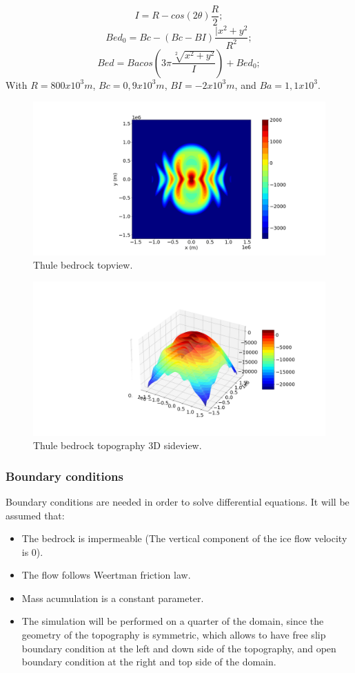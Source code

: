 \documentclass[a4paper,12pt]{article}
\begin{document}
\begin{equation}
	I=R-cos(2\theta)\frac{R}{2};
\end{equation}
\begin{equation}
	Bed_0=Bc-(Bc-BI)\frac{|x^2+y^2}{R^2};
\end{equation}
\begin{equation}
	Bed=Bacos(3\pi\frac{\sqrt[2]{x^2+y^2}}{I})+Bed_0;
\end{equation}
With $R=800 x 10^3 m$, $Bc=0,9 x 10^3 m$, $BI=-2 x 10^3 m$, and $Ba=1,1 x 10^3$.
\begin{figure}[!h]
	\centering
	\includegraphics[width=0.7\linewidth]{../fig/Thule_2D}
	\caption{Thule bedrock topview.}
	\label{Thule_2D}
\end{figure}
\begin{figure}[!h]
	\centering
	\includegraphics[width=0.7\linewidth]{../fig/Thule_3D}
	\caption{Thule bedrock topography 3D sideview.}
	\label{Thule_3D}
\end{figure}
\subsubsection{Boundary conditions}
Boundary conditions are needed in order to solve differential equations. It will be assumed that:
\begin{itemize}
	\item The bedrock is impermeable (The vertical component of the ice flow velocity is 0). 
	\item The flow follows Weertman friction law.
	\item Mass acumulation is a constant parameter.
	\item The simulation will be performed on a quarter of the domain, since the geometry of the topography is symmetric, which allows to have free slip boundary condition at the left and down side of the topography, and open boundary condition at the right and top side of the domain. 
\end{itemize}
\end{document}
